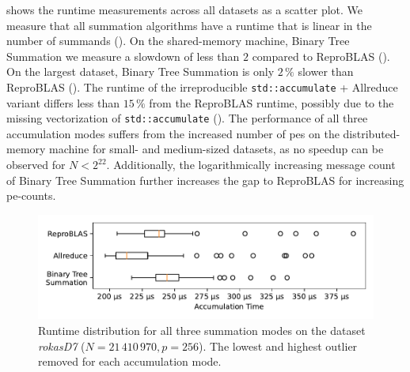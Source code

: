  shows the runtime measurements across all datasets as a scatter plot.
We measure that all summation algorithms have a runtime that is linear in the number of summands ().
On the shared-memory machine, Binary Tree Summation we measure a slowdown of less than $2$ compared to ReproBLAS ().
On the largest dataset, Binary Tree Summation is only $2\,\%$ slower than ReproBLAS ().
The runtime of the irreproducible \texttt{std::accumulate} + Allreduce variant differs less than $15\,\%$ from the ReproBLAS runtime, possibly due to the missing vectorization of \texttt{std::accumulate} ().
The performance of all three accumulation modes suffers from the increased number of \glspl{pe} on the distributed-memory machine for small- and medium-sized datasets, as no speedup can be observed for $N < 2^{22}$.
Additionally, the logarithmically increasing message count of Binary Tree Summation further increases the gap to ReproBLAS for increasing \gls{pe}-counts.\@

\begin{figure}
\centering
\includegraphics[scale=0.75]{figures/boxplotRokasD7.pdf}
\caption{Runtime distribution for all three summation modes on the dataset \textit{rokasD7} ($N = 21\,410\,970, p = 256$). The lowest and highest outlier removed for each accumulation mode.}
\label{fig:boxplotRokasD7}
\end{figure}


